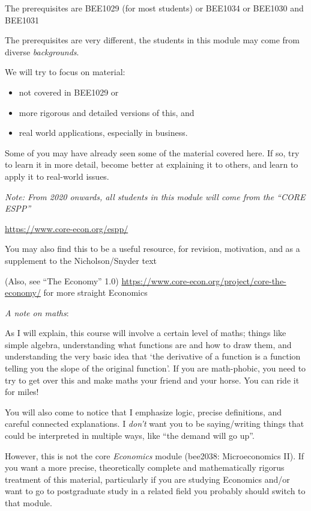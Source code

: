 \documentclass[]{article}
\providecommand{\tightlist}{%
  \setlength{\itemsep}{0pt}\setlength{\parskip}{0pt}}
\begin{document}
The prerequisites are BEE1029 (for most students) or BEE1034 or BEE1030
and BEE1031

The prerequisites are very different, the students in this module may
come from diverse \emph{backgrounds}.

We will try to focus on material:

\begin{itemize}
\tightlist
\item
  not covered in BEE1029 or
\item
  more rigorous and detailed versions of this, and
\item
  real world applications, especially in business.
\end{itemize}

Some of you may have already seen some of the material covered here. If
so, try to learn it in more detail, become better at explaining it to
others, and learn to apply it to real-world issues.

\bigskip

\emph{Note: From 2020 onwards, all students in this module will come
from the ``CORE ESPP''}

\url{https://www.core-econ.org/espp/}

You may also find this to be a useful resource, for revision,
motivation, and as a supplement to the Nicholson/Snyder text

(Also, see ``The Economy'' 1.0)
\url{https://www.core-econ.org/project/core-the-economy/} for more
straight Economics

\bigskip

\emph{A note on maths}:

As I will explain, this course will involve a certain level of maths;
things like simple algebra, understanding what functions are and how to
draw them, and understanding the very basic idea that `the derivative of
a function is a function telling you the slope of the original
function'. If you are math-phobic, you need to try to get over this and
make maths your friend and your horse. You can ride it for miles!

You will also come to notice that I emphasize logic, precise
definitions, and careful connected explanations. I \emph{don't} want you
to be saying/writing things that could be interpreted in multiple ways,
like ``the demand will go up''.

However, this is not the core \emph{Economics} module (bee2038:
Microeconomics II). If you want a more precise, theoretically complete
and mathematically rigorus treatment of this material, particularly if
you are studying Economics and/or want to go to postgraduate study in a
related field you probably should switch to that module.
\end{document}
